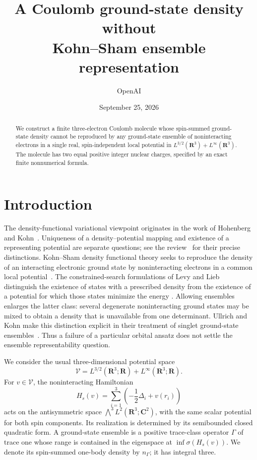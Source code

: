 \documentclass[11pt,a4paper]{article}
\title{A Coulomb ground-state density without\\
Kohn--Sham ensemble representation}
\author{OpenAI}
\date{September 25, 2026}
\newcommand{\R}{\mathbf R}
\newcommand{\C}{\mathbf C}
\theoremstyle{definition}
\theoremstyle{remark}
\numberwithin{equation}{section}
\begin{document}
\maketitle

\begin{abstract}
We construct a finite three-electron Coulomb molecule whose spin-summed
ground-state density cannot be reproduced by any ground-state ensemble
of noninteracting electrons in a single real, spin-independent local
potential in \(L^{3/2}(\R^3)+L^\infty(\R^3)\).
The molecule has two equal positive integer nuclear charges,
specified by an exact finite nonnumerical formula.
\end{abstract}

\section{Introduction}
\label{sec:introduction}

The density-functional variational viewpoint originates in the work
of Hohenberg and Kohn~\cite{HK64}. Uniqueness of a density--potential
mapping and existence of a representing potential are separate
questions; see the review~\cite{Penz23} for their precise distinctions.
Kohn--Sham density functional theory seeks to reproduce the density
of an interacting electronic ground state by noninteracting electrons
in a common local potential~\cite{KS65}.
The constrained-search formulations of Levy and Lieb distinguish the
existence of states with a prescribed density from the existence of
a potential for which those states minimize the energy
\cite{Levy79,Lieb83}.
Allowing ensembles enlarges the latter class: several degenerate
noninteracting ground states may be mixed to obtain a density that
is unavailable from one determinant. Ullrich and Kohn make this
distinction explicit in their treatment of singlet ground-state
ensembles~\cite{UK01}.
Thus a failure of a particular orbital ansatz does not settle the
ensemble representability question.

We consider the usual three-dimensional potential space
\[
\mathcal V=L^{3/2}(\R^3;\R)+L^\infty(\R^3;\R).
\]
For \(v\in\mathcal V\), the noninteracting Hamiltonian
\[
H_s(v)=\sum_{i=1}^3\left(-\frac12\Delta_i+v(r_i)\right)
\]
acts on the antisymmetric space
\(\bigwedge^3L^2(\R^3;\C^2)\), with the same scalar potential for
both spin components. Its realization is determined by its
semibounded closed quadratic form. A ground-state ensemble is a
positive trace-class operator \(\Gamma\) of trace one whose range
is contained in the eigenspace at \(\inf\sigma(H_s(v))\).
We denote its spin-summed one-body density by \(n_\Gamma\);
it has integral three.
\end{document}
